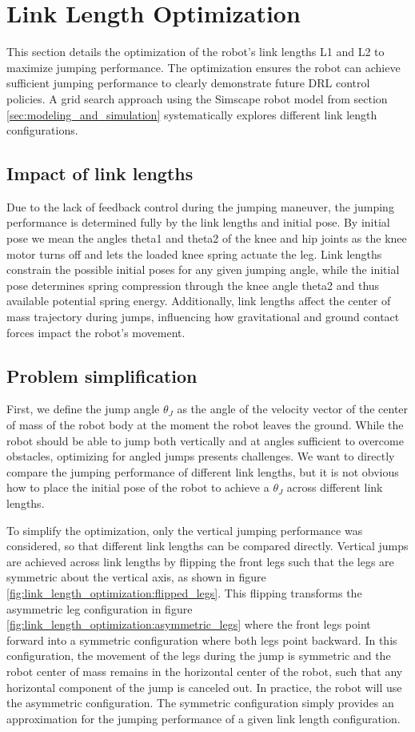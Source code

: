 \section{Link Length Optimization}
\label{sec:link_length_optimization}
This section details the optimization of the robot's link lengths L1 and L2 to maximize jumping performance. The optimization ensures the robot can achieve sufficient jumping performance to clearly demonstrate future DRL control policies. A grid search approach using the Simscape robot model from section \ref{sec:modeling_and_simulation} systematically explores different link length configurations.



\subsection{Impact of link lengths}
Due to the lack of feedback control during the jumping maneuver, the jumping performance is determined fully by the link lengths and initial pose. By initial pose we mean the angles theta1 and theta2 of the knee and hip joints as the knee motor turns off and lets the loaded knee spring actuate the leg. Link lengths constrain the possible initial poses for any given jumping angle, while the initial pose determines spring compression through the knee angle theta2 and thus available potential spring energy. Additionally, link lengths affect the center of mass trajectory during jumps, influencing how gravitational and ground contact forces impact the robot's movement.

\subsection{Problem simplification}
First, we define the jump angle \(\theta_J\) as the angle of the velocity vector of the center of mass of the robot body at the moment the robot leaves the ground. While the robot should be able to jump both vertically and at angles sufficient to overcome obstacles, optimizing for angled jumps presents challenges. We want to directly compare the jumping performance of different link lengths, but it is not obvious how to place the initial pose of the robot to achieve a \(\theta_J\) across different link lengths. 

To simplify the optimization, only the vertical jumping performance was considered, so that different link lengths can be compared directly. Vertical jumps are achieved across link lengths by flipping the front legs such that the legs are symmetric about the vertical axis, as shown in figure \ref{fig:link_length_optimization:flipped_legs}. This flipping transforms the asymmetric leg configuration in figure \ref{fig:link_length_optimization:asymmetric_legs} where the front legs point forward into a symmetric configuration where both legs point backward. In this configuration, the movement of the legs during the jump is symmetric and the robot center of mass remains in the horizontal center of the robot, such that any horizontal component of the jump is canceled out. In practice, the robot will use the asymmetric configuration. The symmetric configuration simply provides an approximation for the jumping performance of a given link length configuration.

